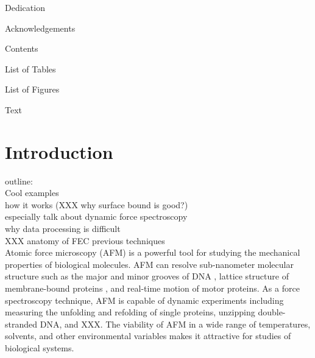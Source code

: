 \documentclass[%
  aip,12pt,tightenlines,
  amsthm,
 amsmath,amssymb
]{article}
\newcommand{\sLabel}[1]{\label{section:#1}}
\newcommand{\firstp}[0]{}
\newcommand{\pl}[0]{\vspace{6pt}}
\newcommand{\citePRH}[1]{\cite{#1}}
\begin{document}
\clearpage

Dedication

\clearpage

Acknowledgements

\clearpage

Contents

\clearpage

List of Tables 

\clearpage

List of Figures 

\clearpage

Text


\maketitle

\doublespacing

\section{\sLabel{Intro}Introduction}

outline:\\
Cool examples \\
how it works  (XXX why surface bound is good?)\\
especially talk about dynamic force spectroscopy \\
why data processing is difficult \\
XXX anatomy of FEC
previous techniques\\

\firstp Atomic force microscopy (AFM) is a powerful tool for studying the mechanical properties of biological molecules.  AFM can resolve sub-nanometer molecular structure such as the major and minor grooves of DNA \citePRH{ido_beyond_2013}, lattice structure of membrane-bound proteins \citePRH{muller_surface_1999}, and real-time motion of motor proteins\citePRH{ando_high-speed_2007}. As a force spectroscopy technique, AFM is capable of dynamic experiments including measuring the unfolding and refolding of single proteins\citePRH{he_direct_2015}, unzipping double-stranded DNA\citePRH{krautbauer_Unzipping_2003}, and XXX. The viability of AFM in a wide range of temperatures, solvents, and other environmental variables makes it attractive for studies of biological systems. \pl
\end{document}
